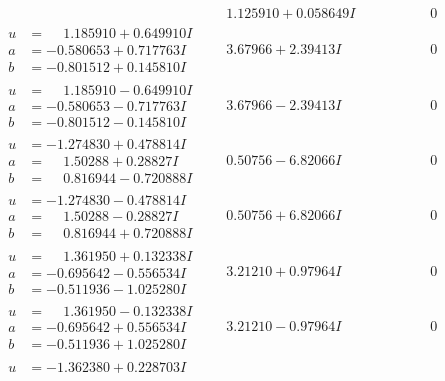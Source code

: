 \documentclass[1p]{elsarticle_modified}
\theoremstyle{definition}
\begin{document}
$$\begin{array}{c|c|c}
 & \phantom{-}1.125910 + 0.058649 I & \phantom{-0.000000 } 0 \\ \hline\begin{aligned}
u &= \phantom{-}1.185910 + 0.649910 I \\
a &= -0.580653 + 0.717763 I \\
b &= -0.801512 + 0.145810 I\end{aligned}
 & \phantom{-}3.67966 + 2.39413 I & \phantom{-0.000000 } 0 \\ \hline\begin{aligned}
u &= \phantom{-}1.185910 - 0.649910 I \\
a &= -0.580653 - 0.717763 I \\
b &= -0.801512 - 0.145810 I\end{aligned}
 & \phantom{-}3.67966 - 2.39413 I & \phantom{-0.000000 } 0 \\ \hline\begin{aligned}
u &= -1.274830 + 0.478814 I \\
a &= \phantom{-}1.50288 + 0.28827 I \\
b &= \phantom{-}0.816944 - 0.720888 I\end{aligned}
 & \phantom{-}0.50756 - 6.82066 I & \phantom{-0.000000 } 0 \\ \hline\begin{aligned}
u &= -1.274830 - 0.478814 I \\
a &= \phantom{-}1.50288 - 0.28827 I \\
b &= \phantom{-}0.816944 + 0.720888 I\end{aligned}
 & \phantom{-}0.50756 + 6.82066 I & \phantom{-0.000000 } 0 \\ \hline\begin{aligned}
u &= \phantom{-}1.361950 + 0.132338 I \\
a &= -0.695642 - 0.556534 I \\
b &= -0.511936 - 1.025280 I\end{aligned}
 & \phantom{-}3.21210 + 0.97964 I & \phantom{-0.000000 } 0 \\ \hline\begin{aligned}
u &= \phantom{-}1.361950 - 0.132338 I \\
a &= -0.695642 + 0.556534 I \\
b &= -0.511936 + 1.025280 I\end{aligned}
 & \phantom{-}3.21210 - 0.97964 I & \phantom{-0.000000 } 0 \\ \hline\begin{aligned}
u &= -1.362380 + 0.228703 I \\

\end{aligned}
\end{array}$$
\end{document}

